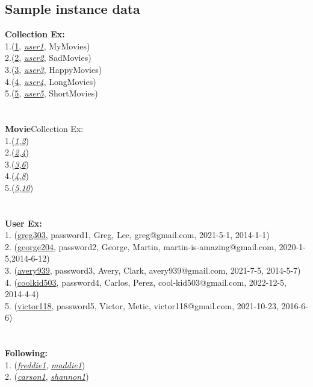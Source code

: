 \documentclass[12pt]{article}
\begin{document}
    \subsection{Sample instance data}
    \textbf{Collection Ex:}\\
    1.(\underline{1}, \emph{\underline{user1}}, MyMovies)\\
    2.(\underline{2}, \emph{\underline{user2}}, SadMovies)\\
    3.(\underline{3}, \emph{\underline{user3}}, HappyMovies)\\
    4.(\underline{4}, \emph{\underline{user4}}, LongMovies)\\
    5.(\underline{5}, \emph{\underline{user5}}, ShortMovies)\\
    \\ \\
    \textbf{Movie}\textunderscore Collection Ex:\\
    1.(\underline{\emph{1}},\underline{\emph{2}})\\
    2.(\underline{\emph{2}},\underline{\emph{4}})\\
    3.(\underline{\emph{3}},\underline{\emph{6}})\\
    4.(\underline{\emph{4}},\underline{\emph{8}})\\
    5.(\underline{\emph{5}},\underline{\emph{10}})\\
    \\ \\
    \textbf{User Ex:}\\
    1. (\underline{greg303}, password1, Greg, Lee, greg@gmail.com, 2021-5-1, 2014-1-1)\\
    2. (\underline{george204}, password2, George, Martin, martin-is-amazing@gmail.com, 2020-1-5,2014-6-12)\\
    3. (\underline{avery939}, password3, Avery, Clark, avery939@gmail.com, 2021-7-5, 2014-5-7)\\
    4. (\underline{coolkid503}, password4, Carlos, Perez, cool-kid503@gmail.com, 2022-12-5, 2014-4-4)\\
    5. (\underline{victor118}, password5, Victor, Metic, victor118@gmail.com, 2021-10-23, 2016-6-6) \\
    \\ \\
    \textbf{Following:}\\
    1. (\emph{\underline{freddie1}}, \emph{\underline{maddie1}})\\
    2. (\emph{\underline{carson1}}, \emph{\underline{shannon1}})\\
\end{document}
